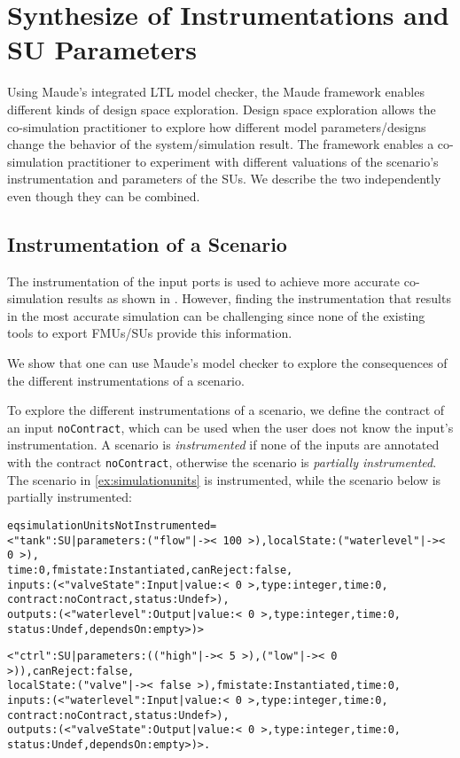 
\section{Synthesize of Instrumentations and SU Parameters}\label{sc:DSE}
Using Maude's integrated LTL model checker, the Maude framework enables different kinds of design space exploration.
Design space exploration allows the co-simulation practitioner to explore how different model parameters/designs change the behavior of the system/simulation result.
The framework enables a co-simulation practitioner to experiment with different valuations of the scenario's instrumentation and parameters of the SUs.
We describe the two independently even though they can be combined.

\subsection{Instrumentation of a Scenario}
The instrumentation of the input ports is used to achieve more accurate co-simulation results as shown in \cite{Gomes2019,Oakes2021,hansen_verification_2021}.
However, finding the instrumentation that results in the most accurate simulation can be challenging since none of the existing tools to export FMUs/SUs provide this information.

We show that one can use Maude's model checker to explore the consequences of the different instrumentations of a scenario.

To explore the different instrumentations of a scenario, we define the contract of an input \texttt{noContract}, which can be used when the user does not know the input's instrumentation.
A scenario is \emph{instrumented} if none of the inputs are annotated with the contract \texttt{noContract}, otherwise the scenario is \emph{partially instrumented}.
The scenario in \cref{ex:simulationunits} is instrumented, while the scenario below is partially instrumented:
\scriptsize
\begin{alltt}
eq simulationUnitsNotInstrumented = 
< "tank" : SU | parameters : ("flow" |-> <\,100\,>),  localState : ("waterlevel" |-> <\,0\,>),
                time : 0,  fmistate : Instantiated, canReject : false, 
                inputs : (< "valveState" : Input | value : <\,0\,>, type : integer, time : 0,
                                                   contract : noContract, status : Undef >), 
                outputs : (< "waterlevel" : Output | value : <\,0\,>, type : integer, time : 0,
                                                     status : Undef, dependsOn : empty >) >

< "ctrl" : SU | parameters : (("high" |-> <\,5\,>) , ("low" |-> <\,0\,>)), canReject : false, 
                localState : ("valve" |-> <\,false\,>), fmistate : Instantiated, time : 0, 
                inputs : (< "waterlevel" : Input | value : <\,0\,>, type : integer, time : 0,
                                                   contract : noContract, status : Undef >), 
                outputs : (< "valveState" : Output | value : <\,0\,>, type : integer, time : 0,
                                                     status : Undef, dependsOn : empty >) > . 

\end{alltt}
\normalsize


